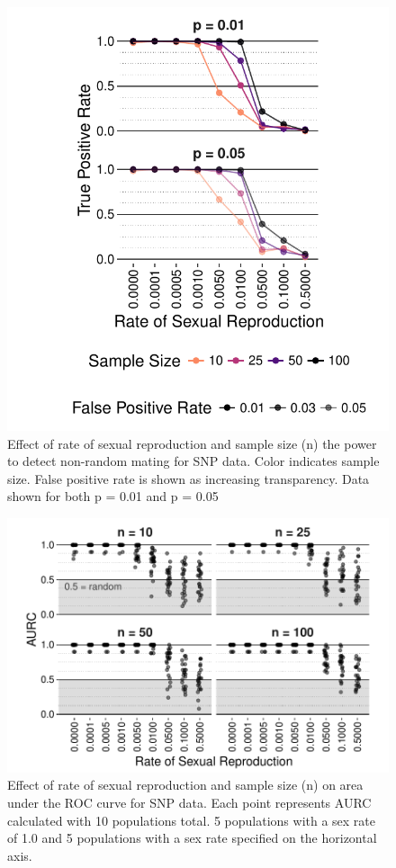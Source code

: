 \documentclass[]{article}
\theoremstyle{definition}
\theoremstyle{definition}
\theoremstyle{remark}
\begin{document}
\begin{figure}
\centering
\includegraphics[width=1.00000\textwidth]{figure/genomic_power.pdf}
\caption{Effect of rate of sexual reproduction and sample size (n) the
power to detect non-random mating for SNP data. Color indicates sample
size. False positive rate is shown as increasing transparency. Data
shown for both p = 0.01 and p = 0.05}\label{fig:sim6}
\end{figure}

\begin{figure}
\centering
\includegraphics[width=1.00000\textwidth]{figure/AURC_genomic.pdf}
\caption{Effect of rate of sexual reproduction and sample size (n) on
area under the ROC curve for SNP data. Each point represents AURC
calculated with 10 populations total. 5 populations with a sex rate of
1.0 and 5 populations with a sex rate specified on the horizontal
axis.}\label{fig:sim7}
\end{figure}
\end{document}
